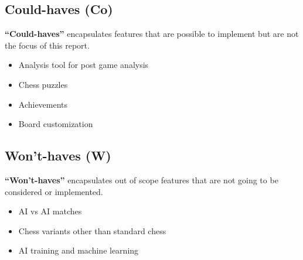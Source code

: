 \subsection{Could-haves (Co)}\label{subsec:could-haves}

\textbf{``Could-haves''} encapsulates features that are possible
to implement but are not the focus of this report.

\begin{itemize}
    \item Analysis tool for post game analysis
    \item Chess puzzles
    \item Achievements
    \item Board customization
\end{itemize}

\subsection{Won't-haves (W)}\label{subsec:wont-haves}

\textbf{``Won't-haves''} encapsulates out of scope features that are not going to be considered or implemented.

\begin{itemize}
    \item AI vs AI matches
    \item Chess variants other than standard chess
    \item AI training and machine learning
\end{itemize}
